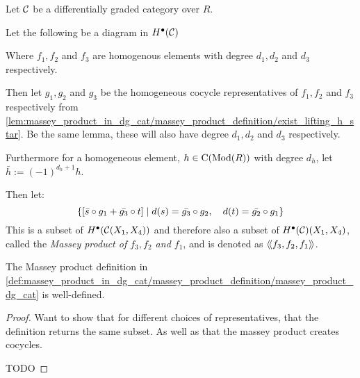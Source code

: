 \begin{definition}
    \label{def:massey_product_in_dg_cat/massey_product_definition/massey_product_dg_cat}
    Let \( {\mathcal{C}} \) be a differentially graded category over \( R \).

    Let the following be a diagram in \( H^\bullet({\mathcal{C}}) \)
    \begin{center}
    \end{center}

    Where \( f_1, f_2 \) and \( f_3 \) are homogenous elements with degree \( d_1, d_2 \) and \( d_3 \) respectively.

    Then let \( g_1, g_2 \) and \( g_3 \) be the homogeneous cocycle representatives of \( f_1, f_2 \) and \( f_3 \) respectively from \autoref{lem:massey_product_in_dg_cat/massey_product_definition/exist_lifting_h_star}. Be the same lemma, these will also have degree \( d_1, d_2 \) and \( d_3 \) respectively.

    Furthermore for a homogeneous element, \( h \in \operatorname{C}(\operatorname{Mod}(R)) \) with degree \( d_h \), let \( \bar{h} := (-1)^{d_h + 1}h \).

    Then let:
    \[
        \{
            [
                \bar{s} \circ g_1 + \bar{g_3} \circ t
            ]
            \mid
            d(s) = \bar{g_3} \circ g_2, \quad
            d(t) = \bar{g_2} \circ g_1
        \}
    \]
    This is a subset of \( H^\bullet ({\mathcal{C}} (X_1, X_4)) \) and therefore also a subset of \( H^\bullet({\mathcal{C}})(X_1, X_4) \), called the \emph{Massey product of \( f_3, f_2 \) and \( f_1 \)}, and is denoted as \( \langle \! \langle f_3, f_2, f_1 \rangle \! \rangle \).
\end{definition}

\begin{theorem}
    The Massey product definition in \autoref{def:massey_product_in_dg_cat/massey_product_definition/massey_product_dg_cat} is well-defined.
\end{theorem}
\begin{proof}
    Want to show that for different choices of representatives, that the definition returns the same subset. As well as that the massey product creates cocycles.

    TODO
\end{proof}

